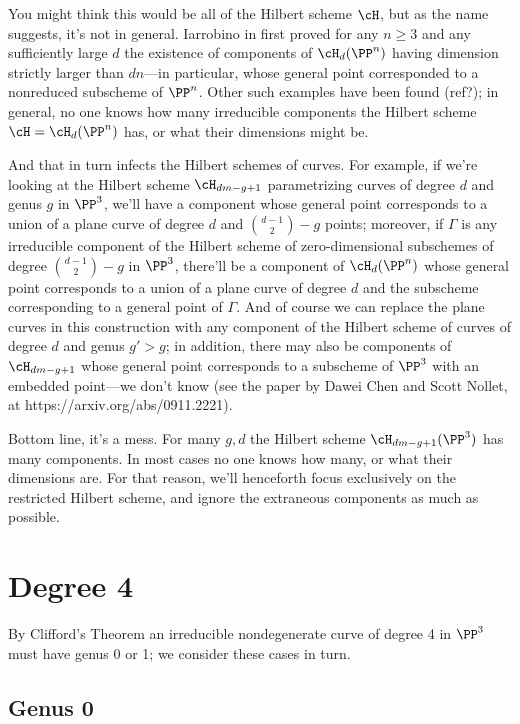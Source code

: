 You might think this would be all of the Hilbert scheme $\cH$, but as the name suggests, it's not in general. Iarrobino in \cite{Iarrobino1985} first proved  for any $n \geq 3$ and any sufficiently large $d$ the existence of components of $\cH_d(\PP^n)$ having dimension strictly larger than $dn$---in particular, whose general point corresponded to a nonreduced subscheme of $\PP^n$. Other such examples have been found (ref?); in general, no one knows how many irreducible components the Hilbert scheme $\cH = \cH_d(\PP^n)$ has, or what their dimensions might be.

And that in turn infects the Hilbert schemes of curves. For example, if we're looking at the Hilbert scheme $\cH_{dm-g+1}$ parametrizing curves of degree $d$ and genus $g$ in $\PP^3$, we'll have a component whose general point corresponds to a union of a plane curve of degree $d$ and $\binom{d-1}{2} - g$ points; moreover, if $\Gamma$ is any irreducible component of the Hilbert scheme of zero-dimensional subschemes of degree $\binom{d-1}{2} - g$ in $\PP^3$, there'll be a component of $\cH_d(\PP^n)$ whose  general point corresponds to a union of a plane curve of degree $d$ and the subscheme corresponding to a general point of $\Gamma$. And of course we can replace the plane curves in this construction with any component of the Hilbert scheme of curves of degree $d$ and genus $g' > g$; in addition, there may also be components of $\cH_{dm-g+1}$ whose general point corresponds to a subscheme of $\PP^3$ with an embedded point---we don't know (see the paper by Dawei Chen and Scott Nollet, at https://arxiv.org/abs/0911.2221).

Bottom line, it's a mess. For many $g,d$ the Hilbert scheme $\cH_{dm-g+1}(\PP^3)$ has many components. In most cases no one knows how many, or what their dimensions are.
For that reason, we'll henceforth focus exclusively on the restricted Hilbert scheme, and ignore the extraneous components as much as possible.

\section{Degree 4}

By Clifford's Theorem  an irreducible nondegenerate curve of degree 4 in $\PP^{3}$ must have genus 0 or 1; we consider these cases in turn.

\subsection{Genus 0}\label{degree 4 genus 0}

